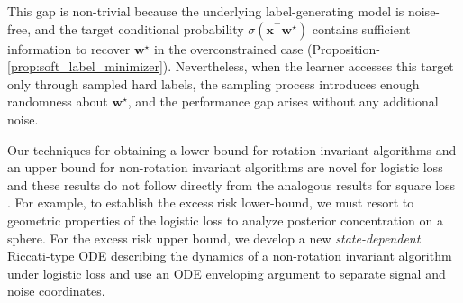 \documentclass{article}
\theoremstyle{plain}
\theoremstyle{definition}
\theoremstyle{remark}
\begin{document}
This gap is non-trivial because the underlying label-generating model is noise-free, and the target conditional probability
$\sigma(\mathbf{x}^\top \mathbf{w}^\star)$ contains sufficient information to recover $\mathbf{w}^\star$ in the overconstrained case (Proposition-\ref{prop:soft_label_minimizer}). Nevertheless, when the learner accesses this target only through sampled hard labels, the sampling process introduces enough randomness about $\mathbf{w}^\star$, and the performance gap arises without any additional noise. 

Our techniques for obtaining a lower bound for rotation invariant algorithms and an upper bound for non-rotation invariant algorithms are novel for logistic loss and these results do not follow directly from the analogous results for square loss \cite{pmlr-v272-warmuth25a}. 
For example, to establish the excess risk lower-bound, we must resort to geometric properties of the logistic loss to analyze posterior concentration on a sphere. For the excess risk upper bound, we develop a new \textit{state-dependent} Riccati-type ODE describing the dynamics of a non-rotation invariant algorithm under logistic loss and use an ODE enveloping argument to separate signal and noise coordinates. 











\end{document}
